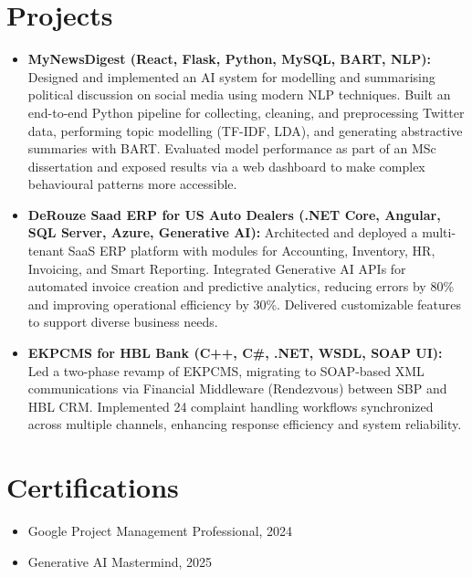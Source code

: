 \documentclass[letterpaper,10pt]{article}
\begin{document}
\section{Projects}
\begin{itemize}
    \setlength\itemsep{3pt}
    \item \textbf{MyNewsDigest (React, Flask, Python, MySQL, BART, NLP):} Designed and implemented an AI system for modelling and summarising political discussion on social media using modern NLP techniques. Built an end-to-end Python pipeline for collecting, cleaning, and preprocessing Twitter data, performing topic modelling (TF-IDF, LDA), and generating abstractive summaries with BART. Evaluated model performance as part of an MSc dissertation and exposed results via a web dashboard to make complex behavioural patterns more accessible.
    \item \textbf{DeRouze Saad ERP for US Auto Dealers (.NET Core, Angular, SQL Server, Azure, Generative AI): } Architected and deployed a multi-tenant SaaS ERP platform with modules for Accounting, Inventory, HR, Invoicing, and Smart Reporting. Integrated Generative AI APIs for automated invoice creation and predictive analytics, reducing errors by 80\% and improving operational efficiency by 30\%. Delivered customizable features to support diverse business needs.
    \item \textbf{EKPCMS for HBL Bank (C++, C\#, .NET, WSDL, SOAP UI):} Led a two-phase revamp of EKPCMS, migrating to SOAP-based XML communications via Financial Middleware (Rendezvous) between SBP and HBL CRM. Implemented 24 complaint handling workflows synchronized across multiple channels, enhancing response efficiency and system reliability.
\end{itemize}

\section{Certifications}
\begin{itemize}
    \item Google Project Management Professional, 2024
    \item Generative AI Mastermind, 2025
\end{itemize}

\vspace*{\fill}
\end{document}
